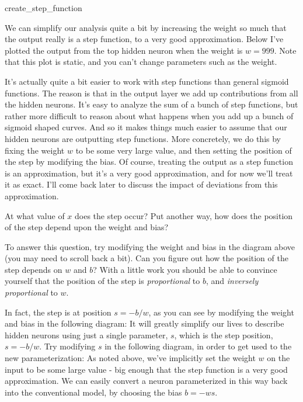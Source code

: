 \begin{movieNote}{create\_\allowbreak{}step\_\allowbreak{}function}
\end{movieNote}

\noindent We can simplify our analysis quite a bit by increasing the weight so much that the output really is a step function, to a very good approximation. Below I've plotted the output from the top hidden neuron when the weight is $w = 999$. Note that this plot is static, and you can't change parameters such as the weight.


It's actually quite a bit easier to work with step functions than general sigmoid functions. The reason is that in the output layer we add up contributions from all the hidden neurons. It's easy to analyze the sum of a bunch of step functions, but rather more difficult to reason about what happens when you add up a bunch of sigmoid shaped curves. And so it makes things much easier to assume that our hidden neurons are outputting step functions. More concretely, we do this by fixing the weight $w$ to be some very large value, and then setting the position of the step by modifying the bias. Of course, treating the output as a step function is an approximation, but it's a very good approximation, and for now we'll treat it as exact. I'll come back later to discuss the impact of deviations from this approximation.


At what value of $x$ does the step occur? Put another way, how does the position of the step depend upon the weight and bias?


To answer this question, try modifying the weight and bias in the diagram above (you may need to scroll back a bit). Can you figure out how the position of the step depends on $w$ and $b$? With a little work you should be able to convince yourself that the position of the step is \emph{proportional} to $b$, and \emph{inversely proportional} to $w$.


In fact, the step is at position $s = -b/w$, as you can see by modifying the weight and bias in the following diagram: It will greatly simplify our lives to describe hidden neurons using just a single parameter, $s$, which is the step position, $s = -b/w$. Try modifying $s$ in the following diagram, in order to get used to the new parameterization: As noted above, we've implicitly set the weight $w$ on the input to be some large value - big enough that the step function is a very good approximation. We can easily convert a neuron parameterized in this way back into the conventional model, by choosing the bias $b = -w s$.


